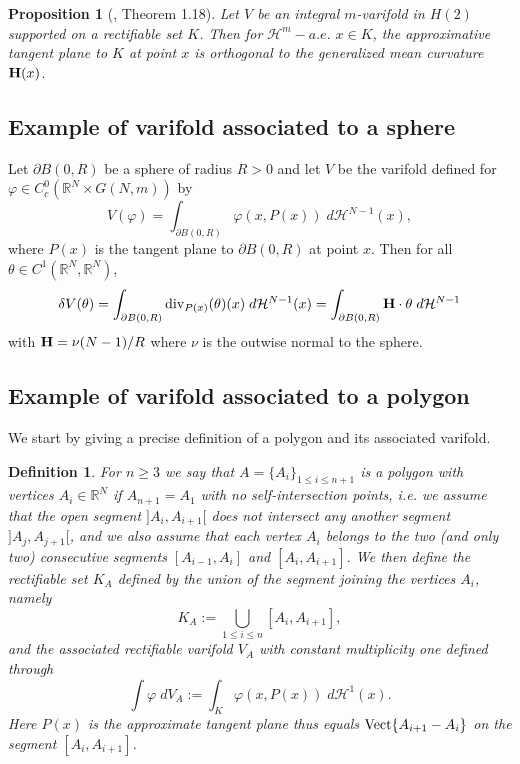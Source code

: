 \documentclass[12pt,english]{smfart} %
\newtheorem{proposition}[theorem]{Proposition}
\newtheorem{definition}[theorem]{Definition}
\theoremstyle{remark}
\newcommand{\R}{\mathbb{R}}
\begin{document}
\medskip\begin{proposition}[\cite{Ton}, Theorem 1.18]\label{orthogonality} Let $V$ be an integral $m$-varifold in $H(2)$ supported on a rectifiable set $K$. Then for $\mathcal{H}^m-a.e.$ $x \in K$, the approximative tangent plane to $K$ at point $x$ is orthogonal to the generalized mean curvature ${\bf H}(x)$.
\end{proposition}

\subsection{Example of varifold associated to a sphere}\label{polygon1}

Let $\partial B(0,R)$ be a sphere of radius $R>0$ and let $V$ be the varifold defined for $\varphi \in C_c^{0}(\R^N \times G(N,m))$ by 
$$V(\varphi)=\int_{\partial B(0,R)} \varphi(x,P(x)) \; d\mathcal{H}^{N-1}(x),$$
where $P(x)$ is the tangent plane to $\partial B(0,R)$ at point $x$. Then for all $\theta\in C^{1}(\R^N,\R^N)$,
$$\delta V(\theta)=\int_{\partial B(0,R)} {\rm div}_{P(x)}(  \theta)(x) \; d\mathcal{H}^{N-1}(x)=\int_{\partial B(0,R)} {\bf H}\cdot  \theta  \; d\mathcal{H}^{N-1}$$
with ${\bf H}= \nu (N-1)/R$ where $\nu$ is the outwise normal to the sphere.

\subsection{Example of varifold associated to a polygon}\label{polygon}We start by giving a precise definition of a polygon and its associated varifold.
 
\medskip\begin{definition} \label{defPolygon} For $n\geqslant 3$ we say that  $A=\{A_i\}_{1\leqslant i \leqslant n+1}$ is  a polygon with vertices $A_i \in \R^N$ if  $A_{n+1}=A_1$ with no self-intersection points, i.e. we assume that  the open  segment $]A_i,A_{i+1}[$ does not intersect any another segment $]A_j,A_{j+1}[$, and we also assume that each vertex $A_i$ belongs to the two (and only two) consecutive segments $[A_{i-1},A_i]$ and $[A_i,A_{i+1}]$. We then define the rectifiable set $K_A$ defined by the union of the segment joining the vertices $A_i$, namely
 $$K_A:=\bigcup_{1\leqslant i \leqslant n}[A_i , A_{i+1}],$$
and the associated rectifiable varifold $V_A$ with constant multiplicity one  defined through 
 $$\int \varphi \;dV_{A}:=\int_{K} \varphi(x,P(x)) \;d\mathcal{H}^1(x).$$
Here $P(x)$ is the approximate tangent plane thus equals $\textnormal{Vect}\{A_{i+1}-A_{i}\}$ on the segment $[A_i,A_{i+1}]$. 
\end{definition}
\end{document}
